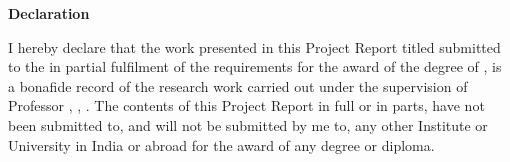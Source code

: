 \begin{flushright}
  \huge{\textbf{Declaration}}
\end{flushright}

\vspace{0.5cm}

I hereby declare that the work presented in this Project Report titled \ttitle{} submitted to the \univname{} in partial fulfilment of the requirements for the award of the degree of \degree{}, is a bonafide record of the research work carried out under the supervision of Professor \supname{}, \suppost{}, \supdeptname{}. The contents of this Project Report in full or in parts, have not been submitted to, and will not be submitted by me to, any other Institute or University in India or abroad for the award of any degree or diploma.

\vspace{2cm}

\begin{flushright}
  \emph{\authorname}\\
  \rn
\end{flushright}
